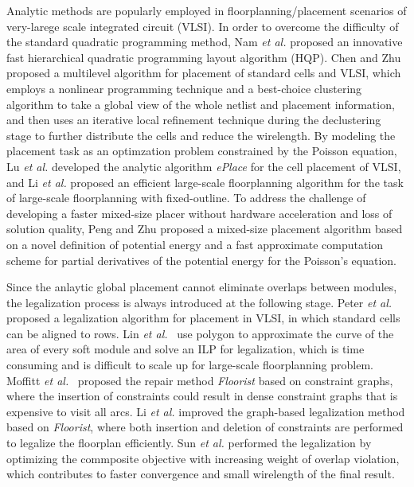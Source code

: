 Analytic methods are popularly employed in floorplanning/placement scenarios of very-larege scale integrated circuit (VLSI). In order to overcome the difficulty of the standard quadratic programming method, Nam \emph{et al.} \cite{nam2006fast} proposed an innovative fast hierarchical quadratic programming layout algorithm (HQP). Chen and Zhu \cite{6238405} proposed a multilevel algorithm for placement of standard cells and VLSI, which employs a nonlinear programming technique and a best-choice clustering algorithm to take a global view of the whole netlist and placement information, and then uses an iterative local refinement technique during the declustering stage to further distribute the cells and reduce the wirelength. By modeling the placement task as an optimzation problem constrained by the Poisson equation, Lu \emph{et al.}  \cite{Lu2015} developed the analytic algorithm \emph{ePlace} for the cell placement of VLSI, and  Li \emph{et al.} \cite{li2022pef} proposed an efficient large-scale floorplanning algorithm for the task of large-scale floorplanning with fixed-outline. To address the challenge of developing a faster mixed-size placer without hardware acceleration and loss of solution quality, Peng and Zhu \cite{10266769} proposed a mixed-size placement algorithm based on a novel definition of potential energy  and a fast approximate computation scheme for partial derivatives of the potential energy for the Poisson’s equation.

 Since the anlaytic global placement cannot eliminate overlaps between modules, the legalization process is always introduced at the following stage.
 Peter \emph{et al.}~\cite{Peter2008} proposed a legalization algorithm for placement in VLSI, in which standard cells can be aligned to rows. Lin \emph{et al.}~\cite{Lin2016} use polygon to approximate the curve of the area of every soft module and solve an ILP for legalization, which is time consuming and is difficult to scale up for large-scale floorplanning problem. Moffitt \emph{et al.}~\cite{Moffitt2006} proposed the repair method \emph{Floorist} based on constraint graphs, where the insertion of constraints could result in dense constraint graphs that is expensive to visit all arcs. Li \emph{et al.} \cite{li2022pef} improved the graph-based legalization method based on \emph{Floorist}, where both insertion and deletion of constraints are performed to legalize the floorplan efficiently. Sun \emph{et al.} \cite{main_ref} performed the legalization by optimizing the commposite objective with increasing weight of overlap violation, which contributes to faster convergence and small wirelength of the final result.



